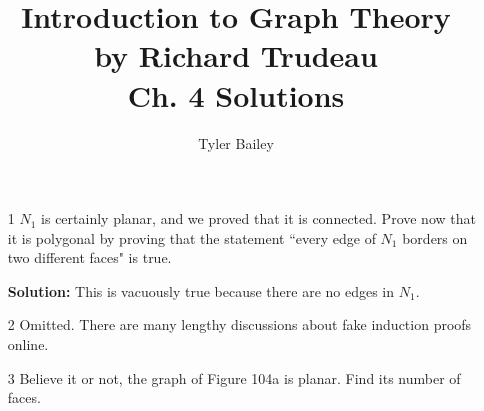 \documentclass{article}
\begin{document}
\title{%
  Introduction to Graph Theory \\
  \large by Richard Trudeau \\
   Ch. 4 Solutions}
   \author{Tyler Bailey}
\maketitle

\begin{enumerate}

	\item[1] $N_1$ is certainly planar, and we proved that it is connected. Prove now that it is polygonal by proving that the statement ``every edge of $N_1$ borders on two different faces" is true.
	
	\textbf{Solution:} This is vacuously true because there are no edges in $N_1$.
	
	\item[2] Omitted. There are many lengthy discussions about fake induction proofs online.
	
	\item[3] Believe it or not, the graph of Figure 104a is planar. Find its number of faces.
	
\end{enumerate}
\end{document}
